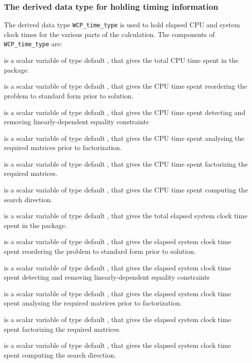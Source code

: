 \documentclass{galahad}
\newcommand{\packagename}{WCP}
\begin{document}
\subsubsection{The derived data type for holding timing 
 information}\label{typetime}
The derived data type 
{\tt \packagename\_time\_type} 
is used to hold elapsed CPU and system clock times for the various parts of 
the calculation. The components of 
{\tt \packagename\_time\_type} 
are:
\begin{description}
 is a scalar variable of type default \realdp, that gives
 the total CPU time spent in the package.

 is a scalar variable of type default \realdp, that gives
 the CPU time spent reordering the problem to standard form prior to solution.

 is a scalar variable of type default \realdp, that gives
 the CPU time spent detecting and removing linearly-dependent equality 
constraints

 is a scalar variable of type default \realdp, that gives
 the CPU time spent analysing the required matrices prior to factorization.

 is a scalar variable of type default \realdp, that gives
 the CPU time spent factorizing the required matrices.

 is a scalar variable of type default \realdp, that gives
 the CPU time spent computing the search direction.

 is a scalar variable of type default \realdp, that gives
 the total elapsed system clock time spent in the package.

 is a scalar variable of type default \realdp, that gives
 the elapsed system clock time spent reordering the problem to standard form 
prior to solution.

 is a scalar variable of type default \realdp, that 
gives  the elapsed system clock time spent detecting and removing 
linearly-dependent equality 
 constraints

 is a scalar variable of type default \realdp, that gives
 the elapsed system clock time spent analysing the required matrices prior to 
factorization.

 is a scalar variable of type default \realdp, that gives
 the elapsed system clock time spent factorizing the required matrices.

 is a scalar variable of type default \realdp, that gives
 the elapsed system clock time spent computing the search direction.

\end{description}
\end{document}
